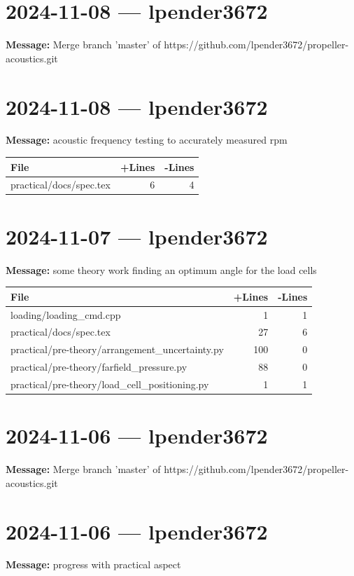 \documentclass{article}
\begin{document}
\section*{2024-11-08 --- lpender3672}
\textbf{Message:} Merge branch 'master' of https://github.com/lpender3672/propeller-acoustics.git

\section*{2024-11-08 --- lpender3672}
\textbf{Message:} acoustic frequency testing to accurately measured rpm

\begin{longtable}{|p{10cm}|r|r|}
\hline \textbf{File} & \textbf{+Lines} & \textbf{-Lines} \\
\hline
practical/docs/spec.tex & 6 & 4 \\
\hline
\end{longtable}

\section*{2024-11-07 --- lpender3672}
\textbf{Message:} some theory work finding an optimum angle for the load cells

\begin{longtable}{|p{10cm}|r|r|}
\hline \textbf{File} & \textbf{+Lines} & \textbf{-Lines} \\
\hline
loading/loading\_cmd.cpp & 1 & 1 \\
\hline
practical/docs/spec.tex & 27 & 6 \\
\hline
practical/pre-theory/arrangement\_uncertainty.py & 100 & 0 \\
\hline
practical/pre-theory/farfield\_pressure.py & 88 & 0 \\
\hline
practical/pre-theory/load\_cell\_positioning.py & 1 & 1 \\
\hline
\end{longtable}

\section*{2024-11-06 --- lpender3672}
\textbf{Message:} Merge branch 'master' of https://github.com/lpender3672/propeller-acoustics.git

\section*{2024-11-06 --- lpender3672}
\textbf{Message:} progress with practical aspect
\end{document}
